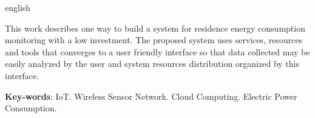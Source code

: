 \begin{resumo}[Abstract]
 \begin{otherlanguage*}{english}

   This work describes one way to build a system for residence energy consumption monitoring with a low investment. The proposed system uses services, resources and tools that converges to a user friendly interface so that data collected may be easily analyzed by the user and system resources distribution organized by this interface.

   \vspace{\onelineskip}
 
   \noindent 
   \textbf{Key-words}: IoT. Wireless Sensor Network. Cloud Computing. Electric Power Consumption.
 \end{otherlanguage*}
\end{resumo}